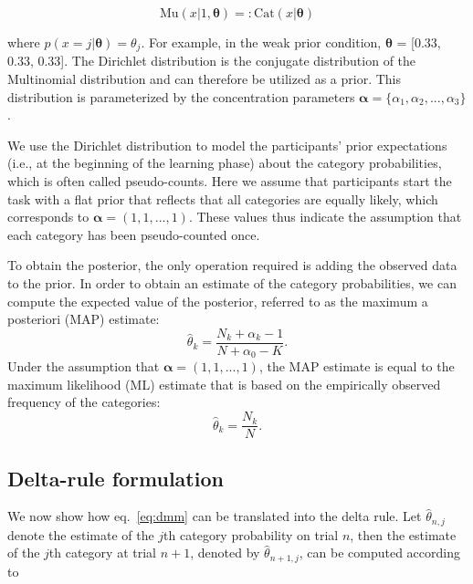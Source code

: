 \documentclass[a4paper,12pt]{article}
\begin{document}
\begin{equation}
\mathrm{Mu}(x|1,\boldsymbol{\theta}) =: \mathrm{Cat}(x|\boldsymbol{\theta})
\end{equation}

\noindent
where $p(x=j|\boldsymbol{\theta}) = \theta_j$. For example, in the weak prior condition, $\boldsymbol{\theta}$ = [0.33, 0.33, 0.33]. The Dirichlet distribution is the conjugate distribution of the Multinomial distribution and can therefore be utilized as a prior. This distribution is parameterized by the concentration parameters $\boldsymbol{\alpha} = \{\alpha_1,\alpha_2,..., \alpha_3\}$.

We use the Dirichlet distribution to model the participants' prior expectations (i.e., at the beginning of the learning phase) about the category probabilities, which is often called pseudo-counts. Here we assume that participants start the task with a flat prior that reflects that all categories are equally likely, which corresponds to $\boldsymbol{\alpha} = (1,1,...,1)$. These values thus indicate the assumption that each category has been pseudo-counted once. 

To obtain the posterior, the only operation required is adding the observed data to the prior. In order to obtain an estimate of the category probabilities, we can compute the expected value of the posterior, referred to as the maximum a posteriori (MAP) estimate:
\begin{equation}
\hat{\theta}_k = \dfrac{N_k+\alpha_k-1}{N+\alpha_0-K}.
\end{equation}
Under the assumption that $\boldsymbol{\alpha} = (1,1,...,1)$, the MAP estimate is equal to the maximum likelihood (ML) estimate that is based on the empirically observed frequency of the categories:
\begin{equation}
\hat{\theta}_k = \dfrac{N_k}{N}.
\label{eq:dmm}
\end{equation}


\subsection{Delta-rule formulation}\label{delta}

We now show how eq.\ \ref{eq:dmm} can be translated into the delta rule. Let $\hat{\theta}_{n,j}$ denote the estimate of the $j$th category probability on trial $n$, then the estimate of the $j$th category at trial $n+1$, denoted by $\hat{\theta}_{n+1,j}$, can be computed according to 
\end{document}
